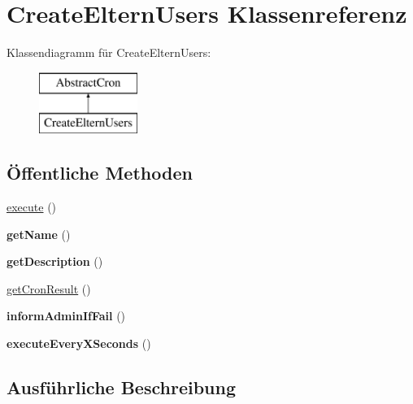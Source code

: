 \hypertarget{class_create_eltern_users}{}\section{Create\+Eltern\+Users Klassenreferenz}
\label{class_create_eltern_users}
Klassendiagramm für Create\+Eltern\+Users\+:\begin{figure}[H]
\begin{center}
\leavevmode
\includegraphics[height=2.000000cm]{class_create_eltern_users}
\end{center}
\end{figure}
\subsection*{Öffentliche Methoden}
\begin{DoxyCompactItemize}
\item 
\mbox{\hyperlink{class_create_eltern_users_a23e592ee1b2064bd81504b3a18cc07aa}{execute}} ()
\item 
\mbox{\label{class_create_eltern_users_acb3e321af90e12c3b1a9b04a2f58b137}} 
{\bfseries get\+Name} ()
\item 
\mbox{\label{class_create_eltern_users_a2f50dbc7785c9d52e3d89a3a1c3d5242}} 
{\bfseries get\+Description} ()
\item 
\mbox{\hyperlink{class_create_eltern_users_a60620ffbb7020ed8b25c767ffe9495d9}{get\+Cron\+Result}} ()
\item 
\mbox{\label{class_create_eltern_users_a4040ca82196f6e295b73052b9507be7f}} 
{\bfseries inform\+Admin\+If\+Fail} ()
\item 
\mbox{\label{class_create_eltern_users_a7f7ffb172ff224006f16c4c666c17c4e}} 
{\bfseries execute\+Every\+X\+Seconds} ()
\end{DoxyCompactItemize}


\subsection{Ausführliche Beschreibung}


